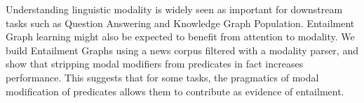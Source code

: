 Understanding linguistic modality is widely seen as important for downstream tasks such as Question Answering and Knowledge Graph Population. Entailment Graph learning might also be expected to benefit from attention to modality. We build Entailment Graphs using a news corpus filtered with a modality parser, and show that stripping modal modifiers from predicates in fact increases performance. This suggests that for some tasks, the pragmatics of modal modification of predicates allows them to contribute as evidence of entailment.
